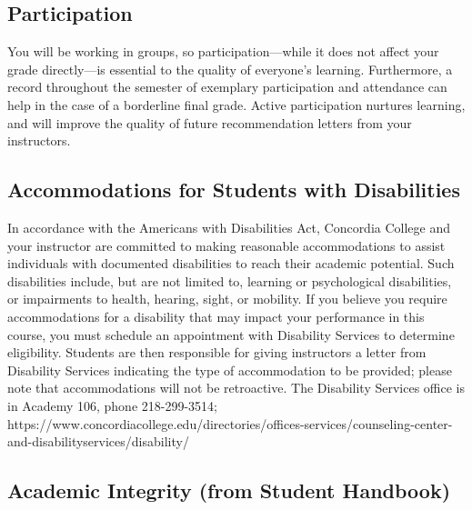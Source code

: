 \documentclass{tufte-handout}
\begin{document}
\begin{fullwidth}
\subsection{Participation}

You will be working in groups, so participation---while it does not affect your grade directly---is essential to the quality of everyone's learning. Furthermore, a record throughout the semester of exemplary participation and attendance can help in the case of a borderline final grade. Active participation nurtures learning, and will improve the quality of future recommendation letters from your instructors.  

\subsection{Accommodations for Students with Disabilities}

In accordance with the Americans with Disabilities Act, Concordia College and your instructor are committed to making reasonable accommodations to assist individuals with documented disabilities to reach their academic potential. Such disabilities include, but are not limited to, learning or psychological disabilities, or impairments to health, hearing, sight, or mobility. If you believe you require accommodations for a disability that may impact your performance in this course, you must schedule an appointment with Disability Services to determine eligibility. Students are then responsible for giving instructors a letter from Disability Services indicating the type of accommodation to be provided; please note that accommodations will not be retroactive. The Disability Services office is in Academy 106, phone 218-299-3514; https://www.concordiacollege.edu/directories/offices-services/counseling-center-and-disabilityservices/disability/ 

\end{fullwidth}

\newpage

\subsection{Academic Integrity (from Student Handbook)}

\end{document}
